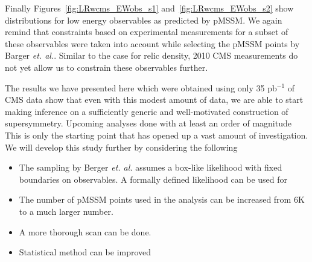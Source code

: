 Finally Figures~\ref{fig:LRwcms_EWobs_s1} and~\ref{fig:LRwcms_EWobs_s2} show distributions for low energy observables as predicted by pMSSM.  We again remind that constraints based on experimental measurements for a subset of these observables were taken into account while selecting the pMSSM points by Barger {\it et. al.}.  Similar to the case for relic density, 2010 CMS measurements do not yet allow us to constrain these observables further. 

The results we have presented here which were obtained using only 35 pb$^{-1}$ of CMS data show that even with this modest amount of data, we are able to start making inference on a sufficiently generic and well-motivated construction of supersymmetry.  Upcoming analyses done with at least an order of magnitude 
This is only the starting point that has opened up a vast amount of investigation.  We will develop this study further by considering the following 

\begin{itemize}
\item The sampling by Berger {\it et. al.} assumes a box-like likelihood with fixed boundaries on observables.  A formally defined likelihood can be used for 
\item The number of pMSSM points used in the analysis can be increased from 6K to a much larger number.  
\item A more thorough scan can be done.
\item Statistical method can be improved
\end{itemize}


